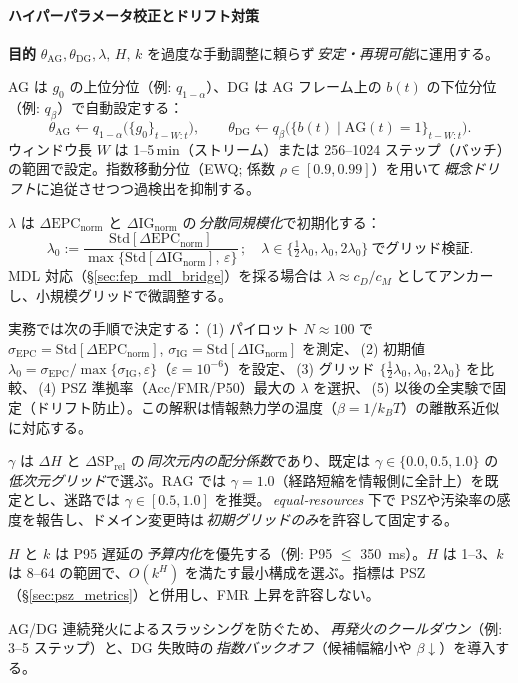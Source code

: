 \documentclass[ja=standard,xelatex]{bxjsarticle}
\newcommand{\gednorm}{\Delta\mathrm{EPC}_{\mathrm{norm}}}
\newcommand{\ignorm}{\Delta\mathrm{IG}_{\mathrm{norm}}}
\begin{document}
\paragraph{ハイパーパラメータ校正とドリフト対策}\label{sec:hyperparam_drift}
\textbf{目的}\; $\theta_{\mathrm{AG}},\theta_{\mathrm{DG}},\lambda,\,H,\,k$ を過度な手動調整に頼らず\,\emph{安定・再現可能}に運用する。
\begin{description}[leftmargin=1.6em]
  \item[閾値の分位校正] \; AG は $g_0$ の上位分位（例: $q_{1-\alpha}$）、DG は AG フレーム上の $b(t)$ の下位分位（例: $q_{\beta}$）で自動設定する：
  \[
    \theta_{\mathrm{AG}} \leftarrow q_{1-\alpha}\big(\{g_0\}_{t-W:t}\big),\qquad
    \theta_{\mathrm{DG}} \leftarrow q_{\beta}\big(\{b(t)\mid \mathrm{AG}(t){=}1\}_{t-W:t}\big).
  \]
  ウィンドウ長 $W$ は 1–5\,min（ストリーム）または 256–1024 ステップ（バッチ）の範囲で設定。指数移動分位（EWQ; 係数 $\rho\in[0.9,0.99]$）を用いて\,\emph{概念ドリフト}に追従させつつ過検出を抑制する。
  \item[スケール合わせ（$\lambda$）] \; $\lambda$ は $\gednorm$ と $\ignorm$ の\,\emph{分散同規模化}で初期化する：
  \[
    \lambda_0 := \frac{\mathrm{Std}[\gednorm]}{\max\{\mathrm{Std}[\ignorm],\,\varepsilon\}}\,;\quad \lambda\in\{\tfrac{1}{2}\lambda_0,\lambda_0,2\lambda_0\}\ \text{でグリッド検証}.
  \]
  MDL 対応（\S\ref{sec:fep_mdl_bridge}）を採る場合は $\lambda\approx c_D/c_M$ としてアンカーし、小規模グリッドで微調整する。
  \item[$\lambda$ の決定手順] \; 実務では次の手順で決定する：\,(1) パイロット $N{\approx}100$ で $\sigma_{\mathrm{EPC}}{=}\mathrm{Std}[\gednorm]$, $\sigma_{\mathrm{IG}}{=}\mathrm{Std}[\ignorm]$ を測定、\,(2) 初期値 $\lambda_0{=}\sigma_{\mathrm{EPC}}/\max\{\sigma_{\mathrm{IG}},\varepsilon\}$（$\varepsilon{=}10^{-6}$）を設定、\,(3) グリッド $\{\tfrac{1}{2}\lambda_0,\lambda_0,2\lambda_0\}$ を比較、\,(4) PSZ 準拠率（Acc/FMR/P50）最大の $\lambda$ を選択、\,(5) 以後の全実験で固定（ドリフト防止）。この解釈は情報熱力学の温度（$\beta{=}1/k_BT$）の離散系近似に対応する。
  \item[$\gamma$ の扱い] \; $\gamma$ は $\Delta H$ と $\Delta\mathrm{SP}_{\mathrm{rel}}$ の\,\emph{同次元内の配分係数}であり、既定は $\gamma\in\{0.0,0.5,1.0\}$ の\,\emph{低次元グリッド}で選ぶ。RAG では $\gamma{=}1.0$（経路短縮を情報側に全計上）を既定とし、迷路では $\gamma{\in}[0.5,1.0]$ を推奨。\,\emph{equal‑resources} 下で PSZや汚染率の感度を報告し、ドメイン変更時は\,\emph{初期グリッドのみ}を許容して固定する。
  \item[計算予算との整合] \; $H$ と $k$ は P95 遅延の\,\emph{予算内化}を優先する（例: P95 $\le$ \SI{350}{ms}）。$H$ は 1–3、$k$ は 8–64 の範囲で、$O(k^H)$ を満たす最小構成を選ぶ。指標は PSZ（\S\ref{sec:psz_metrics}）と併用し、FMR 上昇を許容しない。
  \item[クールダウンとバックオフ] \; AG/DG 連続発火によるスラッシングを防ぐため、\,\emph{再発火のクールダウン}（例: 3–5 ステップ）と、DG 失敗時の\,\emph{指数バックオフ}（候補幅縮小や $\beta\downarrow$）を導入する。
\end{description}
\end{document}
